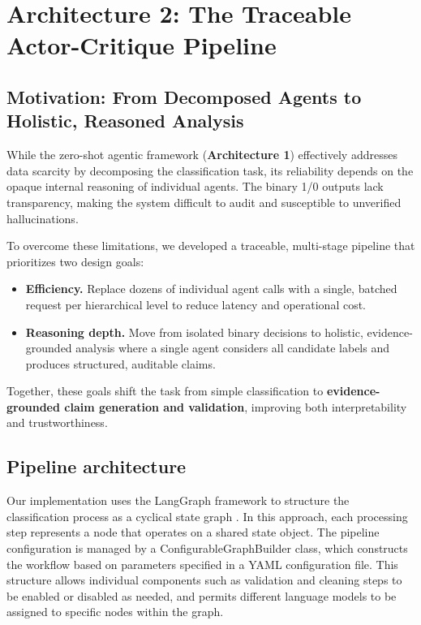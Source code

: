 \section{Architecture 2: The Traceable Actor-Critique Pipeline}

\subsection{Motivation: From Decomposed Agents to Holistic, Reasoned Analysis}

While the zero-shot agentic framework (\textbf{Architecture 1}) effectively addresses data scarcity by decomposing the classification task, its reliability depends on the opaque internal reasoning of individual agents. The binary 1/0 outputs lack transparency, making the system difficult to audit and susceptible to unverified hallucinations.

To overcome these limitations, we developed a traceable, multi-stage pipeline that prioritizes two design goals:

\begin{itemize}
  \item \textbf{Efficiency.} Replace dozens of individual agent calls with a single, batched request per hierarchical level to reduce latency and operational cost.
  \item \textbf{Reasoning depth.} Move from isolated binary decisions to holistic, evidence-grounded analysis where a single agent considers all candidate labels and produces structured, auditable claims.
\end{itemize}

Together, these goals shift the task from simple classification to \textbf{evidence-grounded claim generation and validation}, improving both interpretability and trustworthiness.

\subsection{Pipeline architecture}

Our implementation uses the LangGraph framework to structure the classification process as a cyclical state graph \cite{langgraph2024}. In this approach, each processing step represents a node that operates on a shared state object. The pipeline configuration is managed by a ConfigurableGraphBuilder class, which constructs the workflow based on parameters specified in a YAML configuration file. This structure allows individual components such as validation and cleaning steps to be enabled or disabled as needed, and permits different language models to be assigned to specific nodes within the graph.

